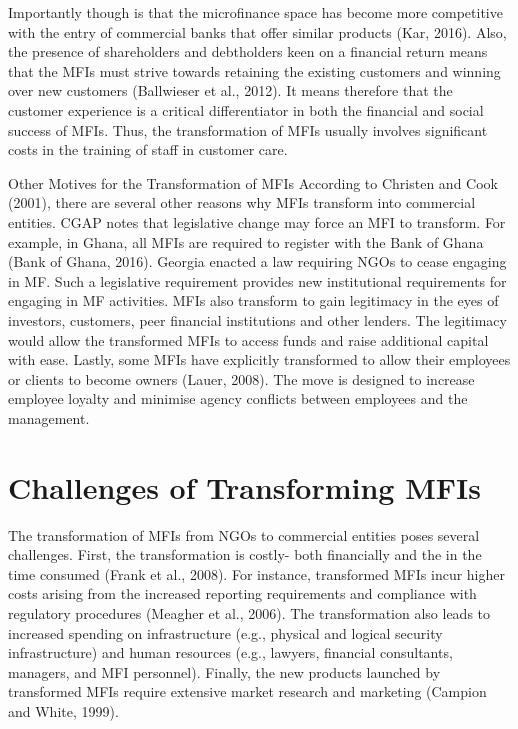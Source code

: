 \documentclass[a4paper, nobind]{templates/ociamthesis}
\begin{document}
Importantly though is that the microfinance space has become more competitive with the entry of commercial banks that offer similar products (Kar, 2016). Also, the presence of shareholders and debtholders keen on a financial return means that the MFIs must strive towards retaining the existing customers and winning over new customers (Ballwieser et al., 2012). It means therefore that the customer experience is a critical differentiator in both the financial and social success of MFIs. Thus, the transformation of MFIs usually involves significant costs in the training of staff in customer care.

\noindent Other Motives for the Transformation of MFIs
According to Christen and Cook (2001), there are several other reasons why MFIs transform into commercial entities. CGAP notes that legislative change may force an MFI to transform. For example, in Ghana, all MFIs are required to register with the Bank of Ghana (Bank of Ghana, 2016). Georgia enacted a law requiring NGOs to cease engaging in MF. Such a legislative requirement provides new institutional requirements for engaging in MF activities. MFIs also transform to gain legitimacy in the eyes of investors, customers, peer financial institutions and other lenders. The legitimacy would allow the transformed MFIs to access funds and raise additional capital with ease. Lastly, some MFIs have explicitly transformed to allow their employees or clients to become owners (Lauer, 2008). The move is designed to increase employee loyalty and minimise agency conflicts between employees and the management.

\hypertarget{challenges-of-transforming-mfis}{%
\section{Challenges of Transforming MFIs}\label{challenges-of-transforming-mfis}}

\noindent The transformation of MFIs from NGOs to commercial entities poses several challenges. First, the transformation is costly- both financially and the in the time consumed (Frank et al., 2008). For instance, transformed MFIs incur higher costs arising from the increased reporting requirements and compliance with regulatory procedures (Meagher et al., 2006). The transformation also leads to increased spending on infrastructure (e.g., physical and logical security infrastructure) and human resources (e.g., lawyers, financial consultants, managers, and MFI personnel). Finally, the new products launched by transformed MFIs require extensive market research and marketing (Campion and White, 1999).
\end{document}
